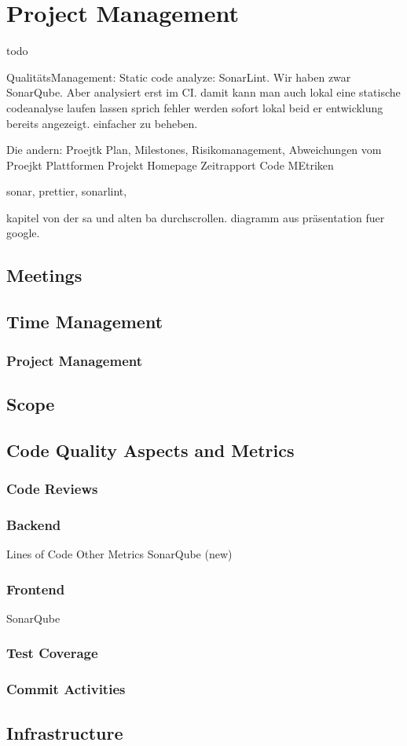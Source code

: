 \section{Project Management}
\label{section:project_management}


todo

QualitätsManagement: Static code analyze: SonarLint. \cite{sonar-lint}
Wir haben zwar SonarQube. Aber analysiert erst im CI.
damit kann man auch lokal eine statische codeanalyse laufen lassen sprich fehler werden sofort lokal beid er
entwicklung bereits angezeigt. einfacher zu beheben.


Die andern:
Proejtk Plan, Milestones, Risikomanagement, Abweichungen vom Proejkt Plattformen
Projekt Homepage
Zeitrapport
Code MEtriken



sonar, prettier, sonarlint,

kapitel von der sa und alten ba durchscrollen.
diagramm aus präsentation fuer google.


\subsection{Meetings}

\subsection{Time Management}
\subsubsection{Project Management}

\subsection{Scope}

\subsection{Code Quality Aspects and Metrics}

\subsubsection{Code Reviews}

\subsubsection{Backend}
Lines of Code
Other Metrics
SonarQube (new)

\subsubsection{Frontend}
SonarQube

\subsubsection{Test Coverage}

\subsubsection{Commit Activities}


\subsection{Infrastructure}
